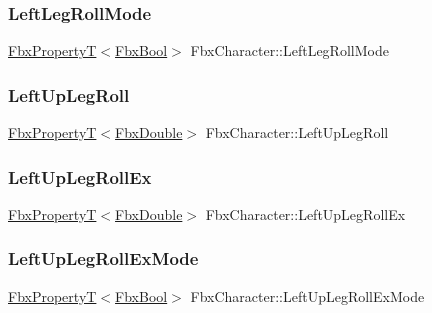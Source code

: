 \subsubsection{\texorpdfstring{Left\+Leg\+Roll\+Mode}{LeftLegRollMode}}
{\footnotesize\ttfamily \hyperlink{class_fbx_property_t}{Fbx\+PropertyT}$<$\hyperlink{fbxtypes_8h_a92e0562b2fe33e76a242f498b362262e}{Fbx\+Bool}$>$ Fbx\+Character\+::\+Left\+Leg\+Roll\+Mode}

\mbox{\label{class_fbx_character_a662864f5da2b33658f85ae9826b0e3f0}} 
\subsubsection{\texorpdfstring{Left\+Up\+Leg\+Roll}{LeftUpLegRoll}}
{\footnotesize\ttfamily \hyperlink{class_fbx_property_t}{Fbx\+PropertyT}$<$\hyperlink{fbxtypes_8h_a171e72a1c46fc15c1a6c9c31948c1c5b}{Fbx\+Double}$>$ Fbx\+Character\+::\+Left\+Up\+Leg\+Roll}

\mbox{\label{class_fbx_character_a8e89a70dc082f417658819afb9dc5299}} 
\subsubsection{\texorpdfstring{Left\+Up\+Leg\+Roll\+Ex}{LeftUpLegRollEx}}
{\footnotesize\ttfamily \hyperlink{class_fbx_property_t}{Fbx\+PropertyT}$<$\hyperlink{fbxtypes_8h_a171e72a1c46fc15c1a6c9c31948c1c5b}{Fbx\+Double}$>$ Fbx\+Character\+::\+Left\+Up\+Leg\+Roll\+Ex}

\mbox{\label{class_fbx_character_a4e769bc27457b215a8c2290bb3800b01}} 
\subsubsection{\texorpdfstring{Left\+Up\+Leg\+Roll\+Ex\+Mode}{LeftUpLegRollExMode}}
{\footnotesize\ttfamily \hyperlink{class_fbx_property_t}{Fbx\+PropertyT}$<$\hyperlink{fbxtypes_8h_a92e0562b2fe33e76a242f498b362262e}{Fbx\+Bool}$>$ Fbx\+Character\+::\+Left\+Up\+Leg\+Roll\+Ex\+Mode}

